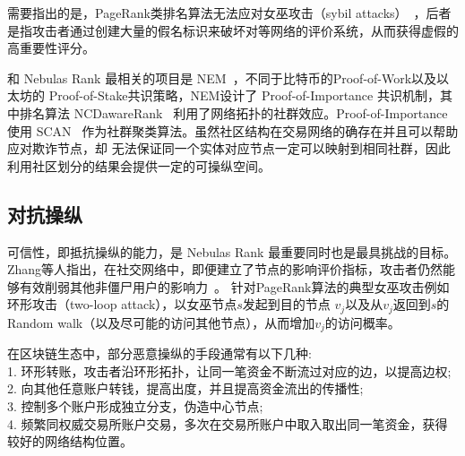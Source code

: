 需要指出的是，PageRank类排名算法无法应对女巫攻击（sybil attacks）~\cite{cheng2006manipulability}，后者是指攻击者通过创建大量的假名标识来破坏对等网络的评价系统，从而获得虚假的高重要性评分。


和 Nebulas Rank 最相关的项目是 NEM~\cite{nem}，不同于比特币的Proof-of-Work以及以太坊的 Proof-of-Stake共识策略，NEM设计了 Proof-of-Importance 共识机制，其中排名算法 NCDawareRank ~\cite{Nikolakopoulos2013}利用了网络拓扑的社群效应。Proof-of-Importance 使用 SCAN ~\cite{xu2007scan}\cite{shiokawa2015scan}\cite{chang2017mathsf}作为社群聚类算法。虽然社区结构在交易网络的确存在并且可以帮助应对欺诈节点，却 无法保证同一个实体对应节点一定可以映射到相同社群，因此利用社区划分的结果会提供一定的可操纵空间。


\subsection{对抗操纵}
可信性，即抵抗操纵的能力，是 Nebulas Rank 最重要同时也是最具挑战的目标。Zhang等人指出，在社交网络中，即便建立了节点的影响评价指标，攻击者仍然能够有效削弱其他非僵尸用户的影响力~\cite{zhang2016truetop}。
针对PageRank算法的典型女巫攻击例如环形攻击（two-loop attack），以女巫节点$s$发起到目的节点
$v_j$以及从$v_j$返回到$s$的Random walk（以及尽可能的访问其他节点），从而增加$v_j$的访问概率。


在区块链生态中，部分恶意操纵的手段通常有以下几种:\\
1. 环形转账，攻击者沿环形拓扑，让同一笔资金不断流过对应的边，以提高边权;\\
2. 向其他任意账户转钱，提高出度，并且提高资金流出的传播性;\\
3. 控制多个账户形成独立分支，伪造中心节点;\\
4. 频繁同权威交易所账户交易，多次在交易所账户中取入取出同一笔资金，获得较好的网络结构位置。\\




